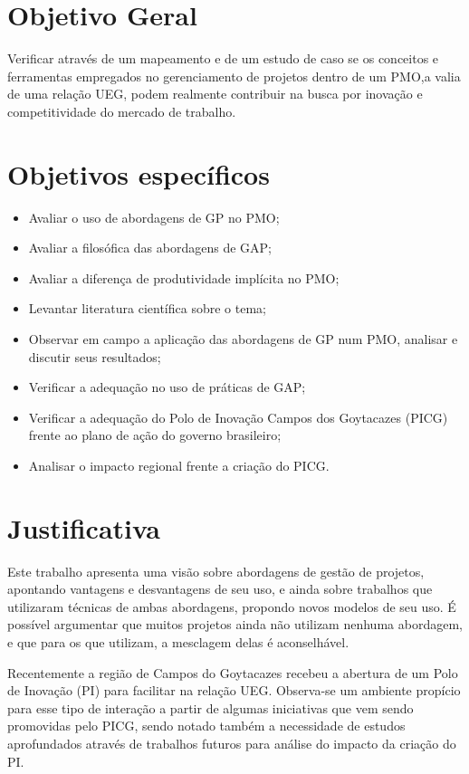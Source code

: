 \section{Objetivo Geral}

Verificar através de um mapeamento e de um estudo de caso se os conceitos e ferramentas empregados no gerenciamento de projetos dentro de um PMO,a valia de uma relação UEG, podem realmente contribuir na busca por inovação e competitividade do mercado de trabalho.


\section{Objetivos específicos}

\begin{itemize}
  \item{Avaliar o uso de abordagens de GP no PMO;}
  \item{Avaliar a filosófica das abordagens de GAP;}
  \item{Avaliar a diferença de produtividade implícita no PMO;}
  \item{Levantar literatura científica sobre o tema;}
  \item{Observar em campo a aplicação das abordagens de GP num PMO, analisar e discutir seus resultados;}
  \item{Verificar a adequação no uso de práticas de GAP;}
  \item{Verificar a adequação do Polo de Inovação Campos dos Goytacazes (PICG) frente ao plano de ação do governo brasileiro;}
  \item{Analisar o impacto regional frente a criação do PICG.}
\end{itemize}

\section{Justificativa}

Este trabalho apresenta uma visão sobre abordagens de gestão de projetos, apontando vantagens e desvantagens de seu uso, e ainda sobre trabalhos que utilizaram técnicas de ambas abordagens, propondo novos modelos de seu uso. É possível argumentar que muitos projetos ainda não utilizam nenhuma abordagem, e que para os que utilizam, a mesclagem delas é aconselhável.

Recentemente a região de Campos do Goytacazes recebeu a abertura de um Polo de Inovação (PI) para facilitar na relação UEG. Observa-se um ambiente propício para esse tipo de interação a partir de algumas iniciativas que vem sendo promovidas pelo PICG, sendo notado também a necessidade de estudos aprofundados através de trabalhos futuros para análise do impacto da criação do PI.

